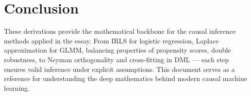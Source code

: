 \documentclass[12pt]{article}
\begin{document}
	\section{Conclusion}
	
	These derivations provide the mathematical backbone for the causal inference methods applied in the essay. From IRLS for logistic regression, Laplace approximation for GLMM, balancing properties of propensity scores, double robustness, to Neyman orthogonality and cross-fitting in DML — each step ensures valid inference under explicit assumptions. This document serves as a reference for understanding the deep mathematics behind modern causal machine learning.
	
\end{document}
